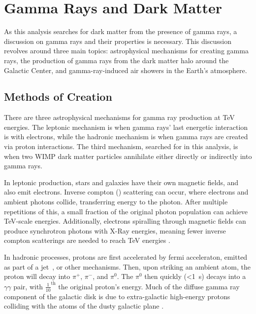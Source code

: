 \cleartooddpage[\thispagestyle{empty}]
\chapter{Gamma Rays and Dark Matter}

As this analysis searches for dark matter from the presence of gamma rays, a discussion on gamma rays and their properties is necessary.
This discussion revolves around three main topics: astrophysical mechanisms for creating gamma rays, the production of gamma rays from the dark matter halo around the Galactic Center, and gamma-ray-induced air showers in the Earth's atmosphere.

\section{Methods of Creation}

  There are three astrophysical mechanisms for gamma ray production at TeV energies.
  The leptonic mechanism is when gamma rays' last energetic interaction is with electrons, while the hadronic mechanism is when gamma rays are created via proton interactions.
  The third mechanism, searched for in this analysis, is when two WIMP dark matter particles annihilate either directly or indirectly into gamma rays.

  In leptonic production, stars and galaxies have their own magnetic fields, and also emit electrons.
  Inverse compton (\cite{compton_effect}) scattering can occur, where electrons and ambient photons collide, transferring energy to the photon.
  After multiple repetitions of this, a small fraction of the original photon population can achieve TeV-scale energies.
  Additionally, electrons spiralling through magnetic fields can produce synchrotron photons with X-Ray energies, meaning fewer inverse compton scatterings are needed to reach TeV energies \cite{self_compton}.

  In hadronic processes, protons are first accelerated by fermi acceleraton, emitted as part of a jet~\cite{hadronic1,hadronic2}, or other mechanisms.
  Then, upon striking an ambient atom, the proton will decay into $\pi^{+}$, $\pi^{-}$, and $\pi^{0}$.
  The $\pi^{0}$ then quickly (<\SI{1}{s}) decays into a $\gamma\gamma$ pair, with \nicetilde $\frac{1}{10}^{\text{th}}$ the original proton's energy.
  Much of the diffuse gamma ray component of the galactic disk is due to extra-galactic high-energy protons colliding with the atoms of the dusty galactic plane \cite{GalacticDiffuseGammaRays}.

